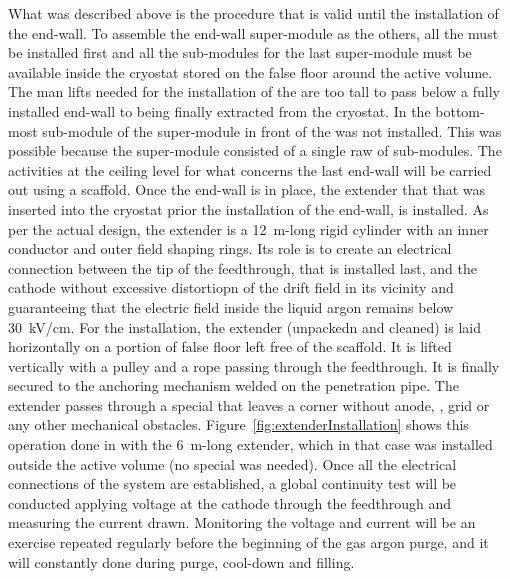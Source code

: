 What was described above is the procedure that is valid until the installation of the  end-wall.
To assemble the end-wall super-module as the others, all the  must be installed first and all the sub-modules for the last super-module must be available inside the cryostat stored on the false floor around the active volume.
The man lifts needed for the installation of the  are too tall to pass below a fully installed end-wall to being finally extracted from the cryostat.
In  the bottom-most sub-module of the super-module in front of the  was not installed.
This was possible because the super-module consisted of a single raw of sub-modules.
The activities at the ceiling level for what concerns the last end-wall will be carried out using a scaffold.
Once the end-wall is in place, the  extender that that was inserted into the cryostat prior the installation of the end-wall,
is installed.
As per the actual design, the extender is a 12~m-long rigid cylinder with an inner conductor and outer field shaping rings.
Its role is to create an electrical connection between the tip of the feedthrough, that is installed last, and the cathode without excessive distortiopn of the drift field in its vicinity and guaranteeing that the electric field inside the liquid argon remains below 30~kV/cm.
For the installation, the extender (unpackedn and cleaned) is laid horizontally on a portion of false floor left free of the scaffold.
It is lifted vertically with a pulley and a rope passing through the  feedthrough.
It is finally secured to the anchoring mechanism welded on the penetration pipe.
The extender passes through a special  that leaves a corner without anode, , grid or any other mechanical obstacles.
Figure~\ref{fig:extenderInstallation} shows this operation done in  with the 6~m-long extender, which in that case was installed outside the active volume (no special  was needed).
Once all the electrical connections of the  system are established, a global continuity test will be conducted applying voltage at the cathode through the  feedthrough and measuring the current drawn.
Monitoring the voltage and current will be an exercise repeated regularly before the beginning of the gas argon purge, and it will constantly done during purge, cool-down and filling. 
